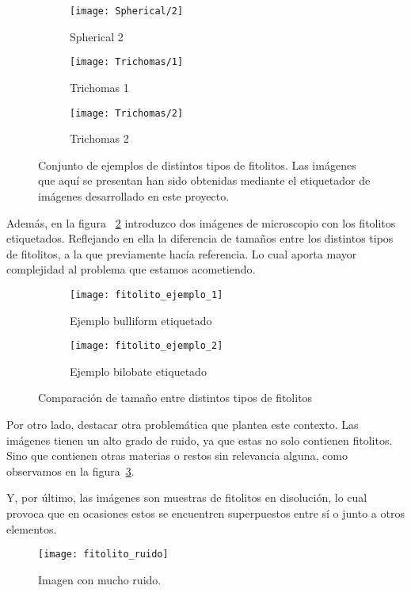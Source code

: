 \begin{figure}
\begin{subfigure}[b]{0.2\textwidth}
        \texttt{[image: Spherical/2]}
        \caption{Spherical 2}
    \end{subfigure}
    \begin{subfigure}[b]{0.2\textwidth}
        \texttt{[image: Trichomas/1]}
        \caption{Trichomas 1}
    \end{subfigure}
    \begin{subfigure}[b]{0.2\textwidth}
        \texttt{[image: Trichomas/2]}
        \caption{Trichomas 2}
    \end{subfigure}
    \caption[Conjunto de ejemplos de distintos tipos de fitolitos.]{Conjunto de ejemplos de distintos tipos de fitolitos. Las imágenes que aquí se presentan han sido obtenidas mediante el etiquetador de imágenes desarrollado en este proyecto.}
	\label{fig:3.1.1}
\end{figure}

Además, en la figura ~\ref{fig:3.1.2} introduzco dos imágenes de microscopio con los fitolitos etiquetados. Reflejando en ella la diferencia de tamaños entre los distintos tipos de fitolitos, a la que previamente hacía referencia. Lo cual aporta mayor complejidad al problema que estamos acometiendo. 

\begin{figure}
	\centering
	\begin{subfigure}[b]{0.8\textwidth}
        \texttt{[image: fitolito\_ejemplo\_1]}
        \caption{Ejemplo bulliform etiquetado}
    \end{subfigure}
    \begin{subfigure}[b]{0.8\textwidth}
        \texttt{[image: fitolito\_ejemplo\_2]}
        \caption{Ejemplo bilobate etiquetado}
    \end{subfigure}
    \caption{Comparación de tamaño entre distintos tipos de fitolitos}
	\label{fig:3.1.2}
\end{figure}

Por otro lado, destacar otra problemática que plantea este contexto. Las imágenes tienen un alto grado de ruido, ya que estas no solo contienen  fitolitos. Sino que contienen otras materias o restos sin relevancia alguna, como observamos en la figura~\ref{fig:3.1.3}. 

Y, por último, las imágenes son muestras de fitolitos en disolución, lo cual provoca que en ocasiones estos se encuentren superpuestos entre sí o junto a otros elementos.

\begin{figure}
\centering
\texttt{[image: fitolito\_ruido]}
\caption{Imagen con mucho ruido.}
\label{fig:3.1.3}
\end{figure}


